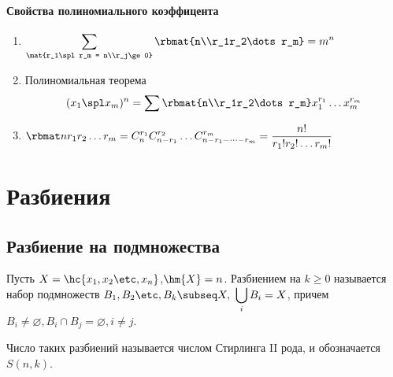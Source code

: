 \documentclass[unicode, 10pt, a4paper, oneside, fleqn]{article}
\begin{document}
\paragraph{Свойства полиномиального коэффицента}
\begin{enumerate}
  \item $\displaystyle \sum\limits_{\tiny \mat{r_1\spl r_m = n\\r_j\ge 0}} \rbmat{n\\r_1r_2\dots r_m} = m^n$
  \item Полиномиальная теорема
    \begin{displaymath}
      (x_1\spl x_m)^n = \sum \rbmat{n\\r_1r_2\dots r_m}x_1^{r_1}\dots x_m^{r_m}
    \end{displaymath}
    \item $\displaystyle \mcr = C_n^{r_1}C_{n-r_1}^{r_2}\dots C_{n-r_1-\dots - r_m}^{r_m} = \frac{n!}{r_1!r_2!\dots r_m!} $
\end{enumerate}
\section{Разбиения}
\subsection{Разбиение на подмножества}
Пусть $X=\hc{\set[x]{n}}$,$\hm{X}=n$. Разбиением на $k\ge 0$ называется
набор подмножеств $\displaystyle \set[B]{k}\subseq X,\  \bigcup\limits_i B_i = X$, причем
$B_i\neq\varnothing, B_i\cap B_j=\varnothing, i\neq j$.
\begin{denote}
  Число таких разбиений называется числом Стирлинга II рода, и обозначается $S(n,k)$.
\end{denote}
\end{document}
